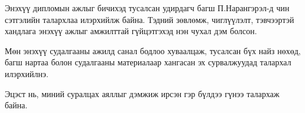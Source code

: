 
\begin{acknowledgements}
\addchaptertocentry{\acknowledgementname}

Энэхүү дипломын ажлыг бичихэд тусалсан удирдагч багш П.Нарангэрэл-д чин сэтгэлийн талархлаа илэрхийлж байна. Тэдний зөвлөмж, чиглүүлэлт, тэвчээртэй хандлага энэхүү ажлыг амжилттай гүйцэтгэхэд нэн чухал дэм болсон.

Мөн энэхүү судалгааны ажилд санал бодлоо хуваалцаж, тусалсан бүх найз нөхөд, багш нартаа болон судалгааны материалаар хангасан эх сурвалжуудад талархал илэрхийлнэ.

Эцэст нь, миний суралцах аяллыг дэмжиж ирсэн гэр бүлдээ гүнээ талархаж байна.

\end{acknowledgements}
